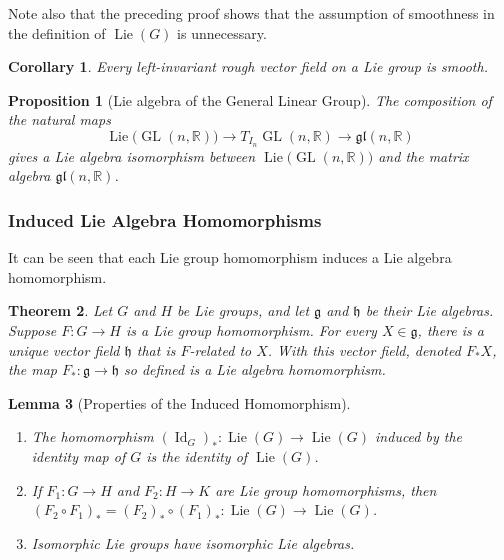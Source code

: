 \documentclass{article}
\DeclareMathOperator{\GL}{GL}
\DeclareMathOperator{\Id}{Id}
\DeclareMathOperator{\Lie}{Lie}
\newtheorem{theorem}{Theorem}[section]
\newtheorem{proposition}[theorem]{Proposition}
\newtheorem{lemma}[theorem]{Lemma}
\newtheorem{corollary}{Corollary}[theorem]
\theoremstyle{remark}
\theoremstyle{definition}
\begin{document}
    Note also that the preceding proof shows that the assumption of smoothness in the definition of $\Lie(G)$ is unnecessary. 

    \begin{corollary}
      Every left-invariant rough vector field on a Lie group is smooth. 
    \end{corollary}

    \begin{proposition}[Lie algebra of the General Linear Group]
      The composition of the natural maps
      \[\Lie \big( \GL(n, \mathbb{R}) \big) \rightarrow T_{I_n} \GL(n, \mathbb{R}) \rightarrow \mathfrak{gl}(n, \mathbb{R})\]
      gives a Lie algebra isomorphism between $\Lie\big(\GL(n, \mathbb{R})\big)$ and the matrix algebra $\mathfrak{gl}(n, \mathbb{R})$. 
    \end{proposition}

    \subsubsection{Induced Lie Algebra Homomorphisms}

      It can be seen that each Lie group homomorphism induces a Lie algebra homomorphism. 

      \begin{theorem}
      Let $G$ and $H$ be Lie groups, and let $\mathfrak{g}$ and $\mathfrak{h}$ be their Lie algebras. Suppose $F: G \longrightarrow H$ is a Lie group homomorphism. For every $X \in \mathfrak{g}$, there is a unique vector field $\mathfrak{h}$ that is $F$-related to $X$. With this vector field, denoted $F_* X$, the map $F_*: \mathfrak{g} \longrightarrow \mathfrak{h}$ so defined is a Lie algebra homomorphism. 
      \end{theorem}

      \begin{lemma}[Properties of the Induced Homomorphism]
      \begin{enumerate}
          \item The homomorphism $(\Id_G)_* : \Lie (G) \longrightarrow \Lie(G)$ induced by the identity map of $G$ is the identity of $\Lie(G)$. 
          \item If $F_1: G \longrightarrow H$ and $F_2: H \longrightarrow K$ are Lie group homomorphisms, then $(F_2 \circ F_1)_* = (F_2)_* \circ (F_1)_* : \Lie(G) \longrightarrow \Lie(G)$. 
          \item Isomorphic Lie groups have isomorphic Lie algebras. 
      \end{enumerate}
      \end{lemma}
\end{document}
